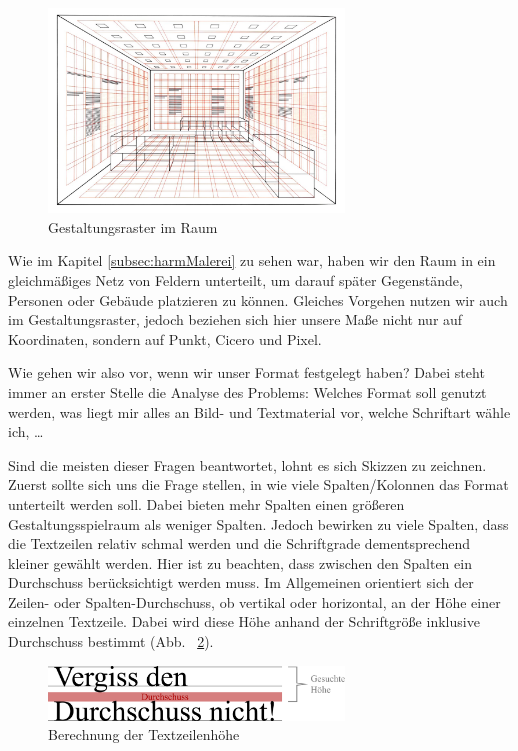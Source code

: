 \documentclass[12pt,a4paper]{article}
\begin{document}
\begin{figure}[htbp]
\centering
\includegraphics[width=0.7\textwidth]{Bilder/3d-grid_brockmann.jpeg}
\caption{Gestaltungsraster im Raum \citep[s.][S.~148]{gestaltungsraster}}
\label{fig:modernSatz}
\end{figure}

Wie im Kapitel \ref{subsec:harmMalerei} zu sehen war, haben wir den Raum in ein gleichmäßiges Netz von Feldern unterteilt, um darauf später Gegenstände, Personen oder Gebäude platzieren zu können. Gleiches Vorgehen nutzen wir auch im Gestaltungsraster, jedoch beziehen sich hier unsere Maße nicht nur auf Koordinaten, sondern auf Punkt, Cicero und Pixel.

Wie gehen wir also vor, wenn wir unser Format festgelegt haben? Dabei steht immer an erster Stelle die Analyse des Problems: Welches Format soll genutzt werden, was liegt mir alles an Bild- und Textmaterial vor, welche Schriftart wähle ich, \dots

Sind die meisten dieser Fragen beantwortet, lohnt es sich Skizzen zu zeichnen. Zuerst sollte sich uns die Frage stellen, in wie viele Spalten/Kolonnen das Format unterteilt werden soll. Dabei bieten mehr Spalten einen größeren Gestaltungsspielraum als weniger Spalten. Jedoch bewirken zu viele Spalten, dass die Textzeilen relativ schmal werden und die Schriftgrade dementsprechend kleiner gewählt werden. Hier ist zu beachten, dass zwischen den Spalten ein Durchschuss berücksichtigt werden muss. Im Allgemeinen orientiert sich der Zeilen- oder Spalten-Durchschuss, ob vertikal oder horizontal, an der Höhe einer einzelnen Textzeile. Dabei wird diese Höhe anhand der Schriftgröße inklusive Durchschuss bestimmt (Abb.~ \ref{fig:durchschuss}). 

\begin{figure}[htbp]
\centering
\includegraphics[width=0.7\textwidth]{Bilder/durchschuss.png}
\caption{Berechnung der Textzeilenhöhe}
\label{fig:durchschuss}
\end{figure}
\end{document}
